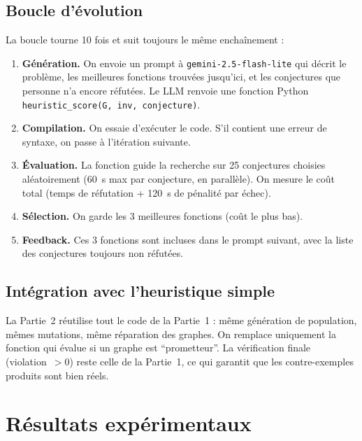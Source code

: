 \documentclass[12pt,a4paper]{article}
\begin{document}
\subsection{Boucle d'évolution}

La boucle tourne 10 fois et suit toujours le même enchaînement :

\begin{enumerate}
  \item \textbf{Génération.}  On envoie un prompt à \texttt{gemini-2.5-flash-lite}
        qui décrit le problème, les meilleures fonctions trouvées jusqu'ici, et les
        conjectures que personne n'a encore réfutées.  Le LLM renvoie une fonction
        Python \texttt{heuristic\_score(G, inv, conjecture)}.
  \item \textbf{Compilation.}  On essaie d'exécuter le code.  S'il contient une
        erreur de syntaxe, on passe à l'itération suivante.
  \item \textbf{Évaluation.}  La fonction guide la recherche sur 25 conjectures
        choisies aléatoirement (60~s max par conjecture, en parallèle).  On mesure
        le coût total (temps de réfutation + 120~s de pénalité par échec).
  \item \textbf{Sélection.}  On garde les 3 meilleures fonctions (coût le plus bas).
  \item \textbf{Feedback.}  Ces 3 fonctions sont incluses dans le prompt suivant,
        avec la liste des conjectures toujours non réfutées.
\end{enumerate}

\subsection{Intégration avec l'heuristique simple}

La Partie~2 réutilise tout le code de la Partie~1 : même génération de population,
mêmes mutations, même réparation des graphes.  On remplace uniquement la fonction
qui évalue si un graphe est ``prometteur''.  La vérification finale (violation~$> 0$)
reste celle de la Partie~1, ce qui garantit que les contre-exemples produits sont
bien réels.

\section{Résultats expérimentaux}
\end{document}
